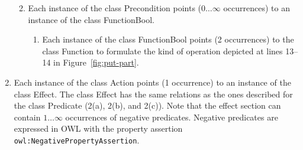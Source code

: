 \begin{enumerate}
\begin{enumerate}
\begin{enumerate}
  \end{enumerate}
    \item Each instance of the class \textsf{Precondition} points ($0\ldots\infty$ occurrences) to an instance of the class \textsf{FunctionBool}.
        \begin{enumerate}
    \item Each instance of the class \textsf{FunctionBool} points (2 occurrences) to the class \textsf{Function} to formulate the kind of operation depicted at lines 13--14 in Figure~\ref{fig:put-part}.
  \end{enumerate}
\end{enumerate}
  \item Each instance of the class \textsf{Action} points (1 occurrence) to an instance of the class \textsf{Effect}. The class \textsf{Effect} has the same relations as the ones described for the class \textsf{Predicate} (2(a), 2(b), and 2(c)). Note that the effect section can contain $1\ldots\infty$ occurrences of negative predicates. Negative predicates are expressed in OWL with the property assertion\\\texttt{owl:NegativePropertyAssertion}.
\end{enumerate}

